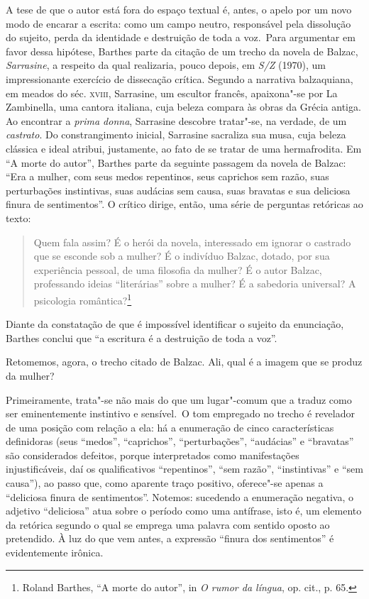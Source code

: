 A tese de que o autor está fora do espaço textual é, antes, o apelo por
um novo modo de encarar a escrita: como um campo neutro, responsável
pela dissolução do sujeito, perda da identidade e destruição de toda a
voz.~Para argumentar em favor dessa hipótese, Barthes parte da citação
de um trecho da novela de Balzac, \emph{Sarrasine}, a respeito da qual
realizaria, pouco depois, em \emph{S/Z} (1970), um impressionante exercício de
dissecação crítica. Segundo a narrativa balzaquiana, em meados do séc.
\textsc{xviii}, Sarrasine, um escultor francês, apaixona"-se por La
Zambinella, uma cantora italiana, cuja beleza compara às obras da Grécia
antiga. Ao encontrar a \emph{prima donna}, Sarrasine descobre tratar"-se, na
verdade, de um \emph{castrato}. Do constrangimento inicial, Sarrasine sacraliza
sua musa, cuja beleza clássica e ideal atribui, justamente, ao fato de
se tratar de uma hermafrodita. Em ``A morte do autor'', Barthes parte da
seguinte passagem da novela de Balzac: ``Era a mulher, com seus medos
repentinos, seus caprichos sem razão, suas perturbações instintivas,
suas audácias sem causa, suas bravatas e sua deliciosa finura de
sentimentos''. O crítico dirige, então, uma série de perguntas retóricas
ao texto:

\begin{quote}
Quem fala assim? É o herói da novela, interessado em ignorar o castrado
que se esconde sob a mulher? É o indivíduo Balzac, dotado, por sua
experiência pessoal, de uma filosofia da mulher? É o autor Balzac,
professando ideias ``literárias'' sobre a mulher? É a sabedoria
universal? A psicologia romântica?\footnote{Roland Barthes, ``A morte do
  autor'', in \emph{O rumor da língua}, op. cit., p. 65.}
\end{quote}

Diante da constatação de que é impossível identificar o sujeito da
enunciação, Barthes conclui que ``a escritura é a destruição de toda a
voz''.

Retomemos, agora, o trecho citado de Balzac. Ali, qual é a imagem que se
produz da mulher?

Primeiramente, trata"-se não mais do que um lugar"-comum que a traduz como
ser eminentemente instintivo e sensível.~O tom empregado no trecho é
revelador de uma posição com relação a ela: há a enumeração de cinco
características definidoras (seus ``medos'', ``caprichos'',
``perturbações'', ``audácias'' e ``bravatas'' são considerados defeitos,
porque interpretados como manifestações injustificáveis, daí os
qualificativos ``repentinos'', ``sem razão'', ``instintivas'' e ``sem
causa''), ao passo que, como aparente traço positivo, oferece"-se apenas
a ``deliciosa finura de sentimentos''. Notemos: sucedendo a enumeração
negativa, o adjetivo ``deliciosa'' atua sobre o período como uma
antífrase, isto é, um elemento da retórica segundo o qual se emprega uma
palavra com sentido oposto ao pretendido. À luz do que vem antes, a
expressão ``finura dos sentimentos'' é evidentemente irônica.

